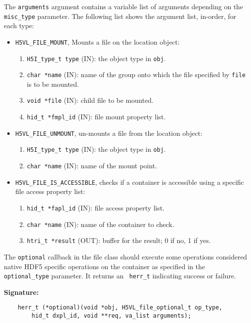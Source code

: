 The {\tt arguments} argument contains a variable list of arguments
depending on the {\tt misc\_type} parameter. The following list shows
the argument list, in-order, for each type:

\begin{itemize}
\item {\tt H5VL\_FILE\_MOUNT}, Mounts a file on the location object:
  \begin{enumerate}
  \item {\tt H5I\_type\_t type} (IN): the object type in {\tt obj}.
  \item {\tt char *name} (IN): name of the group onto which the file
    specified by {\tt file} is to be mounted.
  \item {\tt void *file} (IN): child file to be mounted.
  \item {\tt hid\_t *fmpl\_id} (IN): file mount property list.
  \end{enumerate}

\item {\tt H5VL\_FILE\_UNMOUNT}, un-mounts a file from the location object:
  \begin{enumerate}
  \item {\tt H5I\_type\_t type} (IN): the object type in {\tt obj}.
  \item {\tt char *name} (IN): name of the mount point.
  \end{enumerate}

\item {\tt H5VL\_FILE\_IS\_ACCESSIBLE}, checks if a container is
  accessible using a specific file access property list:
  \begin{enumerate}
  \item {\tt hid\_t *fapl\_id} (IN): file access property list.
  \item {\tt char *name} (IN): name of the container to check.
  \item {\tt htri\_t *result} (OUT): buffer for the result; 0 if no, 1
    if yes.
  \end{enumerate}
\end{itemize}

The {\tt optional} callback in the file class should execute some
operations considered native HDF5 specific operations on the container
as specified in the {\tt optional\_type} parameter. It returns an {\tt
  herr\_t} indicating success or failure.

\textbf{Signature:}
\begin{lstlisting}
    herr_t (*optional)(void *obj, H5VL_file_optional_t op_type, 
        hid_t dxpl_id, void **req, va_list arguments);
\end{lstlisting}

